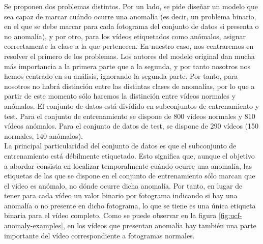 \documentclass[../main.tex]{memoir}
\begin{document}
Se proponen dos problemas distintos. Por un lado, se pide diseñar un
modelo que sea capaz de marcar cuándo ocurre una anomalía (es decir,
un problema binario, en el que se debe marcar para cada fotograma del
conjunto de datos si presenta o no anomalía), y por otro, para los
vídeos etiquetados como anómalos, asignar correctamente la clase a la
que pertenecen. En nuestro caso, nos centraremos en resolver el
primero de los problemas. Los autores del modelo original dan mucha
más importancia a la primera parte que a la segunda, y por tanto
nosotros nos hemos centrado en su análisis, ignorando la segunda
parte. Por tanto, para nosotros no habrá distinción entre las
distintas clases de anomalías, por lo que a partir de este momento
sólo haremos la distinción entre vídeos normales y anómalos. El
conjunto de datos está dividido en subconjuntos de entrenamiento y
test. Para el conjunto de entrenamiento se dispone de 800 vídeos
normales y 810 vídeos anómalos. Para el conjunto de datos de test, se
dispone de 290 vídeos (150 normales, 140 anómalos).\\

La principal particularidad del conjunto de datos es que el
subconjunto de entrenamiento está débilmente etiquetado. Esto
significa que, aunque el objetivo a abordar consista en localizar
temporalmente cuándo ocurre una anomalía, las etiquetas de las que se
dispone en el conjunto de entrenamiento sólo marcan que el vídeo es
anómalo, no dónde ocurre dicha anomalía. Por tanto, en lugar de tener
para cada vídeo un valor binario por fotograma indicando si hay una
anomalía o no presente en dicho fotograma, lo que se tiene es una
única etiqueta binaria para el vídeo completo. Como se puede observar
en la figura \ref{fig:ucf-anomaly-examples}, en los vídeos que presentan
anomalía hay también una parte importante del vídeo correspondiente a
fotogramas normales.\\
\end{document}
